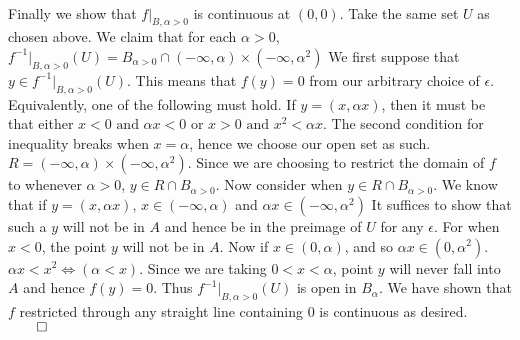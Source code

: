 \documentclass[letterpaper]{article}
\begin{document}
\\ \newline Finally we show that $f|_{B, \alpha >0}$ is continuous at $(0,0)$. Take the same set $U$ as chosen above. We claim that for each $\alpha >0$, $f^{-1}|_{B,\alpha > 0}(U) = B_{\alpha >0} \cap (-\infty , \alpha) \times (-\infty, \alpha^2)$
We first suppose that $y\in f^{-1}|_{B,\alpha > 0}(U)$. This means that $f(y)=0$ from our arbitrary choice of $\epsilon$. Equivalently, one of the following must hold. If $y=(x,\alpha x)$, then it must be that either $x<0 \text{ and } \alpha x <0$ or $x>0 \text{ and } x^2 < \alpha x$. The second condition for inequality breaks when $x=\alpha$, hence we choose our open set as such. $R = (-\infty, \alpha) \times (-\infty, \alpha^2)$. Since we are choosing to restrict the domain of $f$ to whenever $\alpha >0$, $y\in R \cap B_{\alpha >0}$. Now consider when $y\in R \cap B_{\alpha >0}$. We know that if $y=(x, \alpha x)$, $x\in (-\infty, \alpha)$ and $\alpha x \in (-\infty, \alpha^2)$
It suffices to show that such a $y$ will not be in $A$ and hence be in the preimage of $U$ for any $\epsilon$. For when $x<0$, the point $y$ will not be in $A$. Now if $x\in (0,\alpha)$, and so $\alpha x \in (0,\alpha^2)$. $\alpha x < x^2 \iff (\alpha <x)$. Since we are taking $0 < x < \alpha$, point $y$ will never fall into $A$ and hence $f(y)=0$. Thus $f^{-1}|_{B,\alpha > 0}(U)$ is open in $B_{\alpha}$. 
We have shown that $f$ restricted through any straight line containing 0 is continuous as desired. $\qed$
\end{document}
